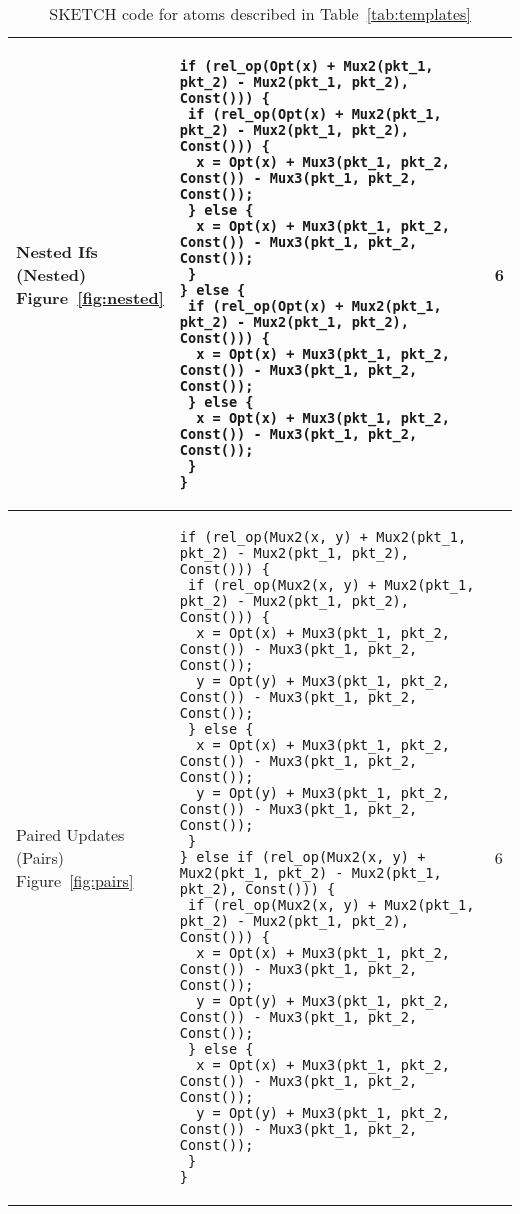 \begin{table*}[!htbp]
\begin{scriptsize}
\begin{tabular}{|p{}|p{}|p{}|}
\hline
\pbox{0.1\textwidth}
{Nested Ifs\\(Nested)\\Figure~\ref{fig:nested}} &
{\begin{lstlisting}[style=customctable]
if (rel_op(Opt(x) + Mux2(pkt_1, pkt_2) - Mux2(pkt_1, pkt_2), Const())) {
 if (rel_op(Opt(x) + Mux2(pkt_1, pkt_2) - Mux2(pkt_1, pkt_2), Const())) {
  x = Opt(x) + Mux3(pkt_1, pkt_2, Const()) - Mux3(pkt_1, pkt_2, Const());
 } else {
  x = Opt(x) + Mux3(pkt_1, pkt_2, Const()) - Mux3(pkt_1, pkt_2, Const());
 }
} else {
 if (rel_op(Opt(x) + Mux2(pkt_1, pkt_2) - Mux2(pkt_1, pkt_2), Const())) {
  x = Opt(x) + Mux3(pkt_1, pkt_2, Const()) - Mux3(pkt_1, pkt_2, Const());
 } else {
  x = Opt(x) + Mux3(pkt_1, pkt_2, Const()) - Mux3(pkt_1, pkt_2, Const());
 }
}
\end{lstlisting}} &
6 \\

\hline
\pbox{0.1\textwidth}
{Paired Updates\\(Pairs)\\Figure~\ref{fig:pairs}} &
{\begin{lstlisting}[style=customctable]
if (rel_op(Mux2(x, y) + Mux2(pkt_1, pkt_2) - Mux2(pkt_1, pkt_2), Const())) {
 if (rel_op(Mux2(x, y) + Mux2(pkt_1, pkt_2) - Mux2(pkt_1, pkt_2), Const())) {
  x = Opt(x) + Mux3(pkt_1, pkt_2, Const()) - Mux3(pkt_1, pkt_2, Const());
  y = Opt(y) + Mux3(pkt_1, pkt_2, Const()) - Mux3(pkt_1, pkt_2, Const());
 } else {
  x = Opt(x) + Mux3(pkt_1, pkt_2, Const()) - Mux3(pkt_1, pkt_2, Const());
  y = Opt(y) + Mux3(pkt_1, pkt_2, Const()) - Mux3(pkt_1, pkt_2, Const());
 }
} else if (rel_op(Mux2(x, y) + Mux2(pkt_1, pkt_2) - Mux2(pkt_1, pkt_2), Const())) {
 if (rel_op(Mux2(x, y) + Mux2(pkt_1, pkt_2) - Mux2(pkt_1, pkt_2), Const())) {
  x = Opt(x) + Mux3(pkt_1, pkt_2, Const()) - Mux3(pkt_1, pkt_2, Const());
  y = Opt(y) + Mux3(pkt_1, pkt_2, Const()) - Mux3(pkt_1, pkt_2, Const());
 } else {
  x = Opt(x) + Mux3(pkt_1, pkt_2, Const()) - Mux3(pkt_1, pkt_2, Const());
  y = Opt(y) + Mux3(pkt_1, pkt_2, Const()) - Mux3(pkt_1, pkt_2, Const());
 }
}
\end{lstlisting}} &
6 \\
\hline

  \end{tabular}
  \end{scriptsize}
  \caption{SKETCH code for atoms described in Table~\ref{tab:templates}}
  \label{tab:atom_code}
\end{table*}
